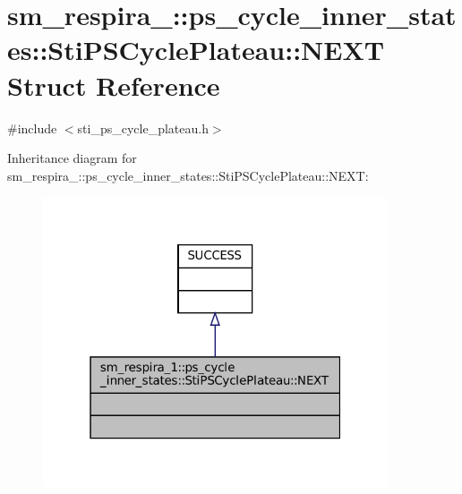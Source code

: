 \hypertarget{structsm__respira__1_1_1ps__cycle__inner__states_1_1StiPSCyclePlateau_1_1NEXT}{}\section{sm\+\_\+respira\+\_\+:\+:ps\+\_\+cycle\+\_\+inner\+\_\+states\+:\+:Sti\+P\+S\+Cycle\+Plateau\+:\+:N\+E\+XT Struct Reference}
\label{structsm__respira__1_1_1ps__cycle__inner__states_1_1StiPSCyclePlateau_1_1NEXT}


{\ttfamily \#include $<$sti\+\_\+ps\+\_\+cycle\+\_\+plateau.\+h$>$}



Inheritance diagram for sm\+\_\+respira\+\_\+:\+:ps\+\_\+cycle\+\_\+inner\+\_\+states\+:\+:Sti\+P\+S\+Cycle\+Plateau\+:\+:N\+E\+XT\+:
\nopagebreak
\begin{figure}[H]
\begin{center}
\leavevmode
\includegraphics[width=289pt]{structsm__respira__1_1_1ps__cycle__inner__states_1_1StiPSCyclePlateau_1_1NEXT__inherit__graph}
\end{center}
\end{figure}


